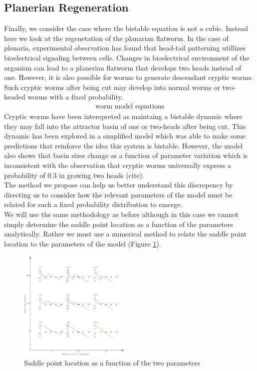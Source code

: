 \documentclass[letterpaper]{article}
\begin{document}
\subsection{Planerian Regeneration}
Finally, we consider the case where the bistable equation is not a cubic. Instead
here we look at the regenetation of the planarian flatworm. In the case of plenaria,
experimental observation has found that head-tail patterning utillizes bioelectrical
signaling between cells. Changes in bioelectrical environment of the organism can
lead to a planerian flatworm that develops two heads instead of one. However, it is 
also possible for worms to generate descendant cryptic worms. Such cryptic 
worms after being cut may develop into normal worms or two-headed worms with a
fixed probability. \\
\begin{eqnarray}
  \text{worm model equations}
\end{eqnarray}
Cryptic worms have been interepreted as maintaing a bistable
dynamic where they may fall into the attractor basin of one or two-heads after being
cut. This dynamic has been explored in a simplified model which was able to make 
some predictions that reinforce the idea this system is bistable. However, the model
also shows that basin sizes change as a function of parameter variation which is 
inconsistent with the observation that cryptic worms universally express a probability
of 0.3 in growing two heads (cite).\\
The method we propose can help us better understand this discrepency by directing 
us to consider how the relevant parameters of the model must be related for such a 
fixed probability distribution to emerge.\\
We will use the same methodology as before although in this case we cannot simply
determine the saddle point location as a function of the parameters analytically.
Rather we must use a numerical method to relate the saddle point location to the
parameters of the model (Figure \ref{fig7}).
\begin{figure}[t]
\begin{center}
\includegraphics[width=2.1in,angle=0]{./worm_params.png}
\caption{Saddle point location as a function of the two parameters}
\label{fig7}
\end{center}
\end{figure}
\end{document}
